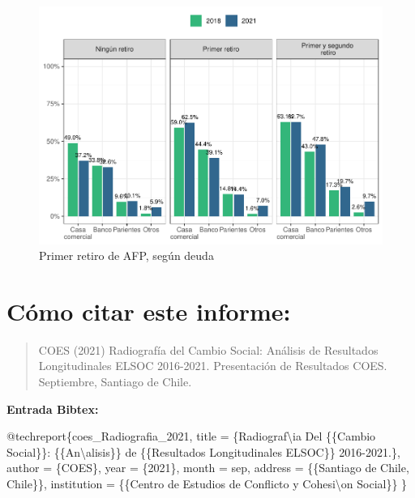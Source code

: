 \documentclass[
  12pt,
]{book}
\newenvironment{Shaded}{\begin{snugshade}}{\end{snugshade}}
\newcommand{\NormalTok}[1]{#1}
\newcommand{\OtherTok}[1]{\textcolor[rgb]{0.56,0.35,0.01}{#1}}
\newcommand{\SpecialCharTok}[1]{\textcolor[rgb]{0.00,0.00,0.00}{#1}}
\newcommand{\StringTok}[1]{\textcolor[rgb]{0.31,0.60,0.02}{#1}}
\begin{document}
\begin{figure}

{\centering \includegraphics{reporte-elsoc_files/figure-latex/deuda-retiro1-1} 

}

\caption{Primer retiro de AFP, según deuda}\label{fig:deuda-retiro1}
\end{figure}

\hypertarget{cuxf3mo-citar-este-informe}{%
\chapter*{Cómo citar este informe:}\label{cuxf3mo-citar-este-informe}}

\begin{quote}
COES (2021) Radiografía del Cambio Social: Análisis de Resultados Longitudinales ELSOC 2016-2021. Presentación de Resultados COES. Septiembre, Santiago de Chile.
\end{quote}

\textbf{Entrada Bibtex:}

\begin{Shaded}
\begin{Highlighting}[]
\SpecialCharTok{@}\NormalTok{techreport\{coes\_Radiografia\_2021,}
\NormalTok{  title }\OtherTok{=}\NormalTok{ \{Radiograf\textbackslash{}}\StringTok{\textquotesingle{}ia Del \{\{Cambio Social\}\}: \{\{An}\SpecialCharTok{\textbackslash{}\textquotesingle{}}\StringTok{alisis\}\} de \{\{Resultados Longitudinales ELSOC\}\} 2016{-}2021.\},}
\StringTok{  author = \{COES\},}
\StringTok{  year = \{2021\},}
\StringTok{  month = sep,}
\StringTok{  address = \{\{Santiago de Chile, Chile\}\},}
\StringTok{  institution = \{\{Centro de Estudios de Conflicto y Cohesi}\SpecialCharTok{\textbackslash{}\textquotesingle{}}\StringTok{on Social\}\}}
\StringTok{\}}
\end{Highlighting}
\end{Shaded}
\end{document}
